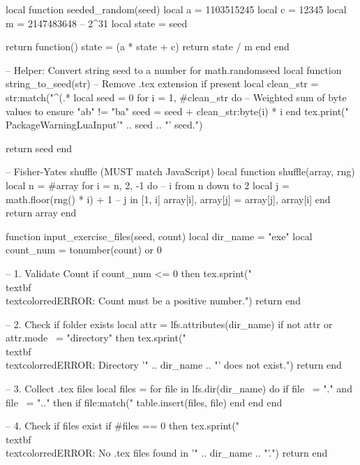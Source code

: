 \usepackage{luacode}

\begin{luacode*}
local function seeded_random(seed)
    local a = 1103515245
    local c = 12345
    local m = 2147483648  -- 2^31
    local state = seed

    return function()
        state = (a * state + c) %
        return state / m
    end
end

-- Helper: Convert string seed to a number for math.randomseed
local function string_to_seed(str)
    -- Remove .tex extension if present
    local clean_str = str:match("^(.*%
    local seed = 0
    for i = 1, #clean_str do
        -- Weighted sum of byte values to ensure "ab" != "ba"
        seed = seed + clean_str:byte(i) * i 
    end
	tex.print("\\PackageWarning{LuaInput}{'" .. seed .. "' seed.}")

    return seed
end

-- Fisher-Yates shuffle (MUST match JavaScript)
local function shuffle(array, rng)
    local n = #array
    for i = n, 2, -1 do  -- i from n down to 2
        local j = math.floor(rng() * i) + 1  -- j in [1, i]
        array[i], array[j] = array[j], array[i]
    end
    return array
end

function input_exercise_files(seed, count)
    local dir_name = "exe"
    local count_num = tonumber(count) or 0

    -- 1. Validate Count
    if count_num <= 0 then
        tex.sprint("\\textbf{\\textcolor{red}{ERROR: Count must be a positive number.}}")
        return
    end

    -- 2. Check if folder exists
    local attr = lfs.attributes(dir_name)
    if not attr or attr.mode ~= "directory" then
        tex.sprint("\\textbf{\\textcolor{red}{ERROR: Directory '" .. dir_name .. "' does not exist.}}")
        return
    end

    -- 3. Collect .tex files
    local files = {}
    for file in lfs.dir(dir_name) do
        if file ~= "." and file ~= ".." then
            if file:match("%
                table.insert(files, file)
            end
        end
    end

    -- 4. Check if files exist
    if #files == 0 then
        tex.sprint("\\textbf{\\textcolor{red}{ERROR: No .tex files found in '" .. dir_name .. "'.}}")
        return
    end


\end{luacode*}
